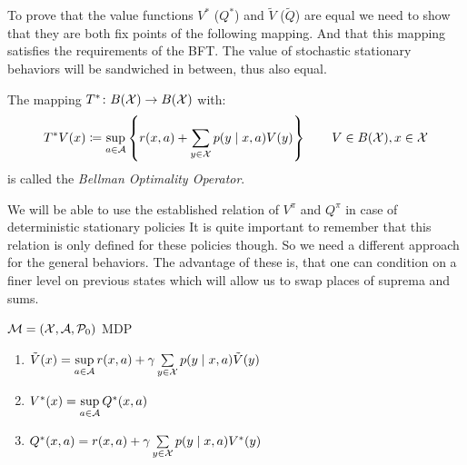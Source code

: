 To prove that the value functions \(V^*\) (\(Q^*\)) and \(\tilde{V}\) (\(\tilde{Q}\))  are equal we need to show that they are both fix points of the following mapping. And that this mapping satisfies the requirements of the BFT. The value of stochastic stationary behaviors will be sandwiched in between, thus also equal. 

\begin{definition}
The mapping \(T^*\colon B(\mathcal{X})\to B(\mathcal{X})\) with:
	\[
	 T^* V(x)\coloneqq \sup_{a\in\mathcal{A}}\left\{r(x,a)+\sum_{y\in\mathcal{X}}p(y\mid x,a) V(y)\right\} \qquad V\in B(\mathcal{X}), x\in\mathcal{X}
	\]
is called the \emph{Bellman Optimality Operator}.
\end{definition}

We will be able to use the established relation of \(V^\pi\) and \(Q^\pi\) in case of deterministic stationary policies
It is quite important to remember that this relation is only defined for these policies though. So we need a different approach for the general behaviors. The advantage of these is, that one can condition on a finer level on previous states which will allow us to swap places of suprema and sums.

\begin{lemma}\label{V*,Q* relation}\(\mathcal{M}=(\mathcal{X},\mathcal{A},\mathcal{P}_0)\) MDP
\begin{enumerate}[label=\textbf{(\roman*)},font=\normalfont]
\item\label{i:1} \(\tilde{V}(x)=\sup\limits_{a\in\mathcal{A}} r(x,a)+\gamma\sum\limits_{y\in\mathcal{X}}p(y\mid x,a)\tilde{V}(y) \)
\item\label{i:3} \(V^*(x)=\sup\limits_{a\in\mathcal{A}}Q^*(x,a)\)
\item\label{i:4} \(Q^*(x,a)=r(x,a)+\gamma \sum\limits_{y\in\mathcal{X}}p(y\mid x,a) V^*(y)\)
\end{enumerate}
\end{lemma}

